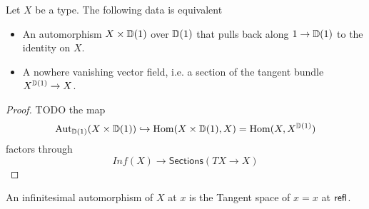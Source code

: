 \begin{lemma}[TODO]
	Let $X$ be a type. The following data is equivalent
	\begin{itemize}
		\item An automorphism $X \times \mathbb{D}(1)$ over $\mathbb{D}(1)$ that pulls back along $1 \to \mathbb{D}(1)$ to the identity on $X$.
		\item A nowhere vanishing vector field, i.e. a section of the tangent bundle $X^{\mathbb{D}(1)} \to X$.
	\end{itemize}
\end{lemma}
\begin{proof}
	TODO
	the map
	\[
	\operatorname{Aut}_{\mathbb{D}(1)}(X \times \mathbb{D}(1)) \hookrightarrow \operatorname{Hom}(X \times \mathbb{D}(1) , X) = \operatorname{Hom}(X , X^{\mathbb{D}(1)})
	\]
	factors through 
	\[
	Inf(X) \to \mathsf{Sections} (T X \to X)
	\]
\end{proof}

\begin{definition}
	An infinitesimal automorphism of $X$ at $x$ is the Tangent space of $x = x$ at $\mathsf{refl}$.
\end{definition}